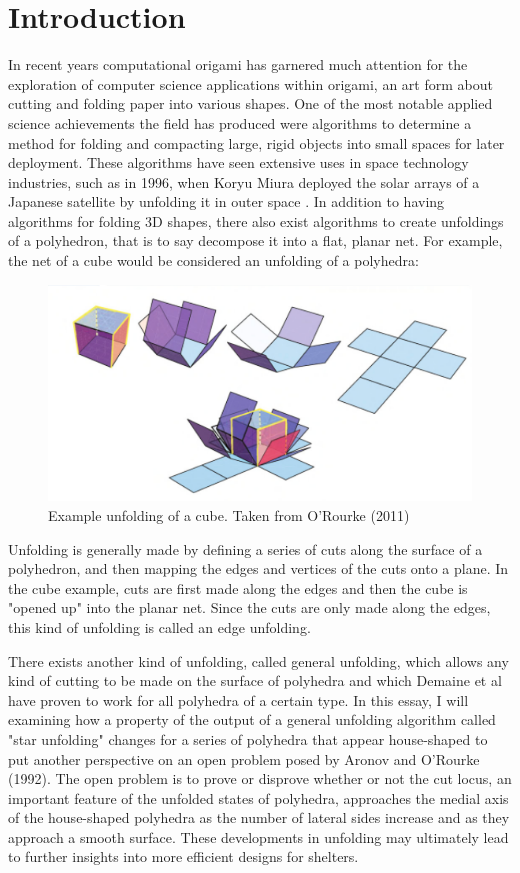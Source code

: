 \documentclass[12 pt]{article}
\begin{document}
\section{Introduction}
In recent years computational origami has garnered much attention for the exploration of computer science applications within origami, an art form about cutting and folding paper into various shapes. One of the most notable applied science achievements the field has produced were algorithms to determine a method for folding and compacting large, rigid objects into small spaces for later deployment. These algorithms have seen extensive uses in space technology industries, such as in 1996, when Koryu Miura deployed the solar arrays of a Japanese satellite by unfolding it in outer space \cite{FOLDIT:1}.
In addition to having algorithms for folding 3D shapes, there also exist algorithms to create unfoldings of a polyhedron, that is to say decompose it into a flat, planar net. For example, the net of a cube would be considered an unfolding of a polyhedra:
\begin{figure}[h]
\caption{Example unfolding of a cube. Taken from O'Rourke (2011)}
\centering
\includegraphics[scale=0.5]{latinCross.png}
\end{figure}

Unfolding is generally made by defining a series of cuts along the surface of a polyhedron, and then mapping the edges and vertices of the cuts onto a plane. In the cube example, cuts are first made along the edges and then the cube is "opened up" into the planar net. Since the cuts are only made along the edges, this kind of unfolding is called an edge unfolding.

There exists another kind of unfolding, called general unfolding, which allows any kind of cutting to be made on the surface of polyhedra and which Demaine et al have proven to work for all polyhedra of a certain type\cite{GFALOP:1}. In this essay, I will examining how a property of the output of a general unfolding algorithm called "star unfolding" changes for a series of polyhedra that appear house-shaped to put another perspective on an  open problem posed by Aronov and O'Rourke (1992). %
The open problem is to prove or disprove whether or not the cut locus, an important feature of the unfolded states of polyhedra, approaches the medial axis of the house-shaped polyhedra as the number of lateral sides increase and as they approach a smooth surface.
These developments in unfolding may ultimately lead to further insights into more efficient designs for shelters.
\end{document}
